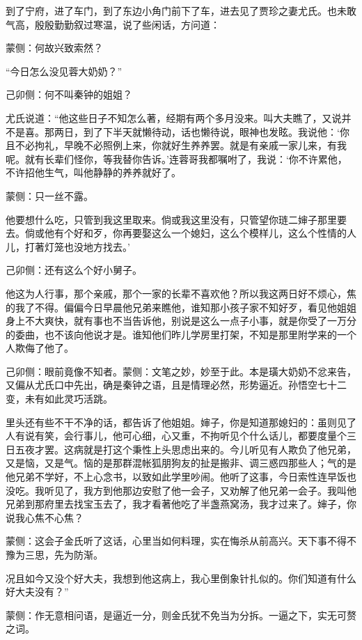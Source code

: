 \begin{parag}
    到了宁府，进了车门，到了东边小角门前下了车，进去见了贾珍之妻尤氏。也未敢气高，殷殷勤勤叙过寒温，说了些闲话，方问道：\begin{note}蒙侧：何故兴致索然？\end{note}“今日怎么没见蓉大奶奶？”\begin{note}己卯侧：何不叫秦钟的姐姐？\end{note}尤氏说道：“他这些日子不知怎么著，经期有两个多月没来。叫大夫瞧了，又说并不是喜。那两日，到了下半天就懒待动，话也懒待说，眼神也发眩。我说他：‘你且不必拘礼，早晚不必照例上来，你就好生养养罢。就是有亲戚一家儿来，有我呢。就有长辈们怪你，等我替你告诉。’连蓉哥我都嘱咐了，我说：‘你不许累他，不许招他生气，叫他静静的养养就好了。\begin{note}蒙侧：只一丝不露。\end{note}他要想什么吃，只管到我这里取来。倘或我这里没有，只管望你琏二婶子那里要去。倘或他有个好和歹，你再要娶这么一个媳妇，这么个模样儿，这么个性情的人儿，打著灯笼也没地方找去。’\begin{note}己卯侧：还有这么个好小舅子。\end{note}他这为人行事，那个亲戚，那个一家的长辈不喜欢他？所以我这两日好不烦心，焦的我了不得。偏偏今日早晨他兄弟来瞧他，谁知那小孩子家不知好歹，看见他姐姐身上不大爽快，就有事也不当告诉他，别说是这么一点子小事，就是你受了一万分的委曲，也不该向他说才是。谁知他们昨儿学房里打架，不知是那里附学来的一个人欺侮了他了。\begin{note}己卯侧：眼前竟像不知者。蒙侧：文笔之妙，妙至于此。本是璜大奶奶不忿来告，又偏从尤氏口中先出，确是秦钟之语，且是情理必然，形势逼近。孙悟空七十二变，未有如此灵巧活跳。\end{note}里头还有些不干不净的话，都告诉了他姐姐。婶子，你是知道那媳妇的：虽则见了人有说有笑，会行事儿，他可心细，心又重，不拘听见个什么话儿，都要度量个三日五夜才罢。这病就是打这个秉性上头思虑出来的。今儿听见有人欺负了他兄弟，又是恼，又是气。恼的是那群混帐狐朋狗友的扯是搬非、调三惑四那些人；气的是他兄弟不学好，不上心念书，以致如此学里吵闹。他听了这事，今日索性连早饭也没吃。我听见了，我方到他那边安慰了他一会子，又劝解了他兄弟一会子。我叫他兄弟到那府里去找宝玉去了，我才看著他吃了半盏燕窝汤，我才过来了。婶子，你说我心焦不心焦？\begin{note}蒙侧：这会子金氏听了这话，心里当如何料理，实在悔杀从前高兴。天下事不得不豫为三思，先为防渐。\end{note}况且如今又没个好大夫，我想到他这病上，我心里倒象针扎似的。你们知道有什么好大夫没有？”\begin{note}蒙侧：作无意相问语，是逼近一分，则金氏犹不免当为分拆。一逼之下，实无可赘之词。\end{note}
\end{parag}


